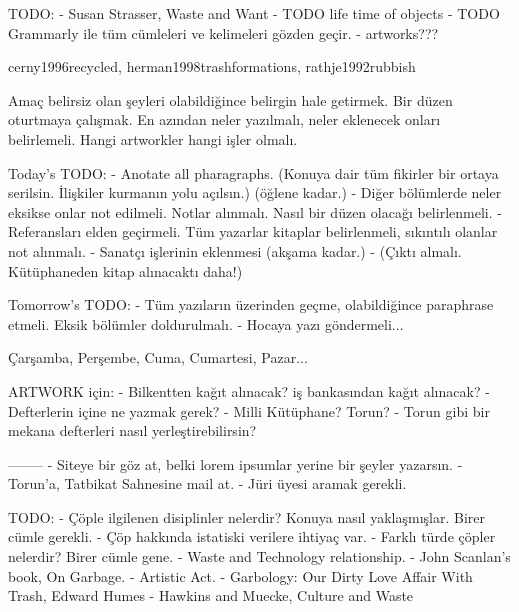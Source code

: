 TODO:
- Susan Strasser, Waste and Want
- TODO life time of objects
- TODO Grammarly ile tüm cümleleri ve kelimeleri gözden geçir.
- artworks???

cerny1996recycled, herman1998trashformations, rathje1992rubbish

Amaç belirsiz olan şeyleri olabildiğince belirgin hale getirmek. Bir düzen oturtmaya çalışmak.
En azından neler yazılmalı, neler eklenecek onları belirlemeli. Hangi artworkler hangi işler olmalı.

Today's TODO:
- Anotate all pharagraphs. (Konuya dair tüm fikirler bir ortaya serilsin. İlişkiler kurmanın yolu açılsın.) (öğlene kadar.)
- Diğer bölümlerde neler eksikse onlar not edilmeli. Notlar alınmalı. Nasıl bir düzen olacağı belirlenmeli.
- Referansları elden geçirmeli. Tüm yazarlar kitaplar belirlenmeli, sıkıntılı olanlar not alınmalı.
- Sanatçı işlerinin eklenmesi (akşama kadar.)
- (Çıktı almalı. Kütüphaneden kitap alınacaktı daha!)

Tomorrow's TODO:
- Tüm yazıların üzerinden geçme, olabildiğince paraphrase etmeli. Eksik bölümler doldurulmalı.
- Hocaya yazı göndermeli...

Çarşamba, Perşembe, Cuma, Cumartesi, Pazar...

ARTWORK için:
- Bilkentten kağıt alınacak? iş bankasından kağıt alınacak?
- Defterlerin içine ne yazmak gerek?
- Milli Kütüphane? Torun?
- Torun gibi bir mekana defterleri nasıl yerleştirebilirsin?

--------
- Siteye bir göz at, belki lorem ipsumlar yerine bir şeyler yazarsın.
- Torun'a, Tatbikat Sahnesine mail at.
- Jüri üyesi aramak gerekli.

TODO:
- Çöple ilgilenen disiplinler nelerdir? Konuya nasıl yaklaşmışlar. Birer cümle gerekli.
- Çöp hakkında istatiski verilere ihtiyaç var.
- Farklı türde çöpler nelerdir? Birer cümle gene.
- Waste and Technology relationship.
- John Scanlan's book, On Garbage.
- Artistic Act.
- Garbology: Our Dirty Love Affair With Trash, Edward Humes
- Hawkins and Muecke, Culture and Waste

